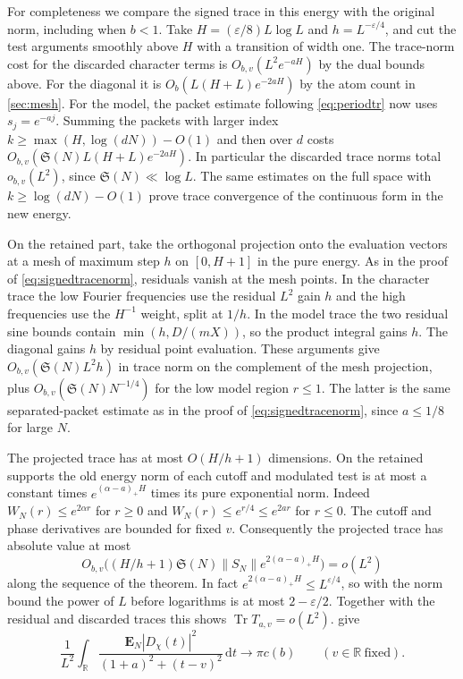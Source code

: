 \documentclass[11pt,a4paper]{article}
\numberwithin{equation}{section}
\newcommand{\SSS}{\mathfrak S}
\newcommand{\ud}{\mathrm d}
\begin{document}
For completeness we compare the signed trace in this
energy with the original norm, including when $b<1$.
Take $H=(\varepsilon/8)L\log L$ and $h=L^{-\varepsilon/4}$,
and cut the
test arguments smoothly above $H$ with a transition of
width one. The trace-norm cost for the discarded
character terms is $O_{b,v}(L^2 e^{-aH})$ by the
dual bounds above. For the diagonal it is
$O_b(L(H+L)e^{-2aH})$ by the atom count in
\cref{sec:mesh}. For the model, the packet estimate
following \cref{eq:periodtr} now uses $s_j=e^{-aj}$.
Summing the packets with larger index
$k\ge\max(H,\log(dN))-O(1)$ and then over $d$
costs $O_{b,v}(\SSS(N)L(H+L)e^{-2aH})$.
In particular the discarded trace norms total $o_{b,v}(L^2)$,
since $\SSS(N)\ll\log L$. The same estimates on the full
space with $k\ge\log(dN)-O(1)$ prove trace convergence
of the continuous form in the new energy.

On the retained part, take the orthogonal projection onto
the evaluation vectors at a mesh of maximum step $h$
on $[0,H+1]$ in the pure energy. As in the proof of
\cref{eq:signedtracenorm}, residuals vanish at the mesh
points. In the character trace the low Fourier frequencies
use the residual $L^2$ gain $h$ and the high frequencies
use the $H^{-1}$ weight, split at $1/h$. In the model
trace the two residual sine bounds contain $\min(h,D/(mX))$,
so the product integral gains $h$. The diagonal gains
$h$ by residual point evaluation. These arguments give
$O_{b,v}(\SSS(N)L^2h)$ in trace norm on the complement
of the mesh projection, plus $O_{b,v}(\SSS(N)N^{-1/4})$
for the low model region $r\le1$. The latter is the same
separated-packet estimate as in the proof of
\cref{eq:signedtracenorm}, since $a\le1/8$ for large $N$.

The projected trace has at most $O(H/h+1)$ dimensions.
On the retained supports the old energy norm of each
cutoff and modulated test is at most a constant times
$e^{(\alpha-a)_+H}$ times its pure exponential norm.
Indeed $W_N(r)\le e^{2\alpha r}$ for $r\ge0$ and
$W_N(r)\le e^{r/4}\le e^{2ar}$ for $r\le0$.
The cutoff and phase derivatives are bounded for fixed
$v$. Consequently the projected trace has absolute value
at most
\[
 O_{b,v}\bigl((H/h+1)\SSS(N)\|S_N\|
                       e^{2(\alpha-a)_+H}\bigr)=o(L^2)
\]
along the sequence of the theorem. In fact
$e^{2(\alpha-a)_+H}\le L^{\varepsilon/4}$, so with the
norm bound the power of $L$ before logarithms is at most
$2-\varepsilon/2$.
Together with the residual and discarded traces this
shows $\operatorname{Tr}T_{a,v}=o(L^2)$.
 give
\[
 \frac1{L^2}\int_{\mathbb R}
     \frac{\mathbf E_N|D_\chi(t)|^2}{(1+a)^2+(t-v)^2}\,\ud t
                        \longrightarrow \pi c(b)
 \qquad(v\in\mathbb R\ \text{fixed}).
\]
\end{document}
